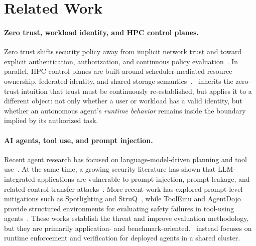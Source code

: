 \section{Related Work}

\paragraph{Zero trust, workload identity, and HPC control planes.}
Zero trust shifts security policy away from implicit network trust and toward explicit authentication, authorization, and continuous policy evaluation~\cite{kindervag2010zero,rose2020zta,chandramouli2023zta}. In parallel, HPC control planes are built around scheduler-mediated resource ownership, federated identity, and shared storage semantics~\cite{neuman1994kerberos,basney2014cilogon,yoo2003slurm,lustre2025intro,ibm2024spectrumscale}. \projectname~inherits the zero-trust intuition that trust must be continuously re-established, but applies it to a different object: not only whether a user or workload has a valid identity, but whether an autonomous agent's \emph{runtime behavior} remains inside the boundary implied by its authorized task.

\paragraph{AI agents, tool use, and prompt injection.}
Recent agent research has focused on language-model-driven planning and tool use~\cite{schick2023toolformer,yao2023react,wang2023voyager,mialon2023augmented,xi2023agentsurvey,masterman2024agentsurvey}. At the same time, a growing security literature has shown that LLM-integrated applications are vulnerable to prompt injection, prompt leakage, and related control-transfer attacks~\cite{perez2022ignore,greshake2023indirect,liu2023houyi,liu2024prompt,zou2023universal,weidinger2022taxonomy,owasp2025llm}. More recent work has explored prompt-level mitigations such as Spotlighting and StruQ~\cite{hines2024spotlighting,chen2024struq}, while ToolEmu and AgentDojo provide structured environments for evaluating safety failures in tool-using agents~\cite{ruan2023toolemu,debenedetti2024agentdojo}. These works establish the threat and improve evaluation methodology, but they are primarily application- and benchmark-oriented. \projectname~instead focuses on runtime enforcement and verification for deployed agents in a shared cluster.

